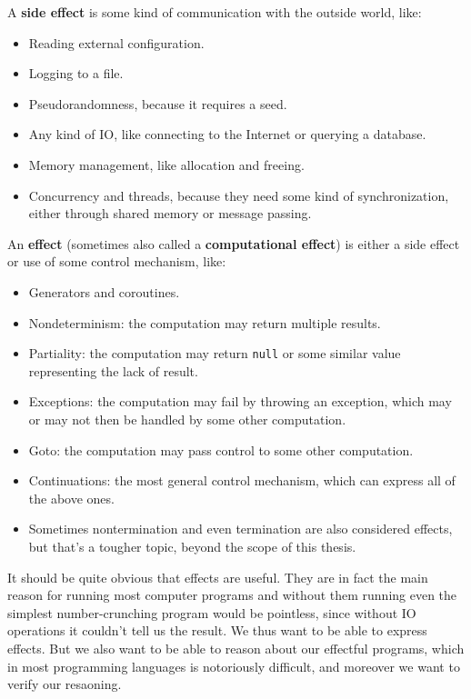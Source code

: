 \documentclass[declaration,inz,english,shortabstract]{iithesis}
\newcommand{\m}[1]{\texttt{#1}}
\begin{document}
A \textbf{side effect} is some kind of communication with the outside world, like:

\begin{itemize}
    \item Reading external configuration.
    \item Logging to a file.
    \item Pseudorandomness, because it requires a seed.
    \item Any kind of IO, like connecting to the Internet or querying a database.
    \item Memory management, like allocation and freeing.
    \item Concurrency and threads, because they need some kind of synchronization, either through shared memory or message passing.
\end{itemize}

An \textbf{effect} (sometimes also called a \textbf{computational effect}) is either a side effect or use of some control mechanism, like:

\begin{itemize}
    \item Generators and coroutines.
    \item Nondeterminism: the computation may return multiple results.
    \item Partiality: the computation may return \m{null} or some similar value representing the lack of result.
    \item Exceptions: the computation may fail by throwing an exception, which may or may not then be handled by some other computation.
    \item Goto: the computation may pass control to some other computation.
    \item Continuations: the most general control mechanism, which can express all of the above ones.
    \item Sometimes nontermination and even termination are also considered effects, but that's a tougher topic, beyond the scope of this thesis.
\end{itemize}

It should be quite obvious that effects are useful. They are in fact the main reason for running most computer programs and without them running even the simplest number-crunching program would be pointless, since without IO operations it couldn't tell us the result. We thus want to be able to express effects. But we also want to be able to reason about our effectful programs, which in most programming languages is notoriously difficult, and moreover we want to verify our resaoning.
\end{document}
